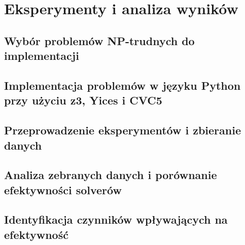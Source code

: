 \chapter{Eksperymenty i analiza wyników}

\section{Wybór problemów NP-trudnych do implementacji}

\section{Implementacja problemów w języku Python przy użyciu z3, Yices i CVC5}

\section{Przeprowadzenie eksperymentów i zbieranie danych}

\section{Analiza zebranych danych i porównanie efektywności solverów}

\section{Identyfikacja czynników wpływających na efektywność}

